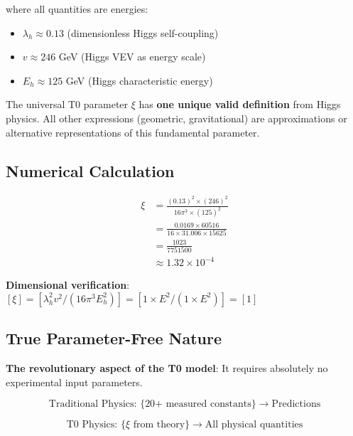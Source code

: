 \documentclass[12pt,a4paper]{article}
\newcommand{\checked}{\checkmark}
\newcommand{\xipar}{\xi}
\begin{document}
	where all quantities are energies:
	\begin{itemize}
		\item $\lambda_h \approx 0.13$ (dimensionless Higgs self-coupling)
		\item $v \approx 246$ GeV (Higgs VEV as energy scale)
		\item $E_h \approx 125$ GeV (Higgs characteristic energy)
	\end{itemize}
	
	\begin{tcolorbox}[colback=blue!5!white,colframe=blue!75!black,title=Parameter Definition]
		The universal T0 parameter $\xi$ has \textbf{one unique valid definition} from Higgs physics. All other expressions (geometric, gravitational) are approximations or alternative representations of this fundamental parameter.
	\end{tcolorbox}
	
	\subsection{Numerical Calculation}
	\label{subsec:numerical_xi_calculation}
	
	\begin{align}
		\xipar &= \frac{(0.13)^2 \times (246)^2}{16\pi^3 \times (125)^2} \\
		&= \frac{0.0169 \times 60516}{16 \times 31.006 \times 15625} \\
		&= \frac{1023}{7751500} \\
		&\approx 1.32 \times 10^{-4}
		\label{eq:xi_numerical}
	\end{align}
	
	\textbf{Dimensional verification}: $[\xipar] = [\lambda_h^2 v^2/(16\pi^3 E_h^2)] = [1 \times E^2/(1 \times E^2)] = [1]$ \checked
\subsection{True Parameter-Free Nature}
\label{subsec:parameter_free_nature}

\textbf{The revolutionary aspect of the T0 model}: It requires absolutely no experimental input parameters.

\begin{equation}
	\text{Traditional Physics: } \{\text{20+ measured constants}\} \rightarrow \text{Predictions}
\end{equation}

\begin{equation}
	\text{T0 Physics: } \{\xi \text{ from theory}\} \rightarrow \text{All physical quantities}
\end{equation}
\end{document}
